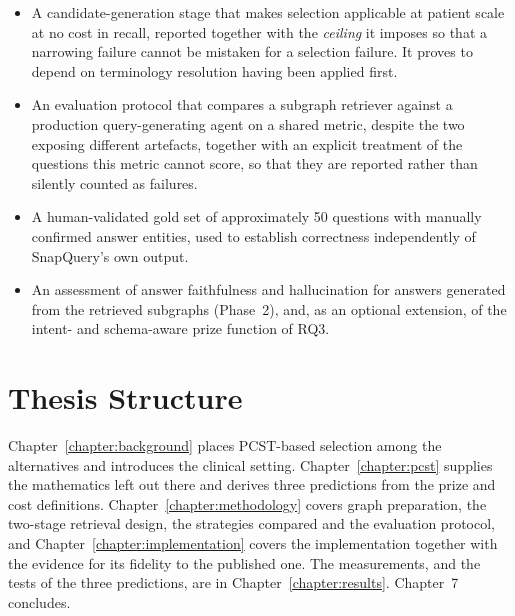 \begin{itemize}
\item A candidate-generation stage that makes selection applicable at patient
scale at no cost in recall, reported together with the \emph{ceiling} it imposes
so that a narrowing failure cannot be mistaken for a selection failure. It proves
to depend on terminology resolution having been applied first.

\item An evaluation protocol that compares a subgraph retriever against a
production query-generating agent on a shared metric, despite the two exposing
different artefacts, together with an explicit treatment of the questions this
metric cannot score, so that they are reported rather than silently counted as
failures.

\item A human-validated gold set of approximately 50 questions with manually
confirmed answer entities, used to establish correctness independently of
SnapQuery's own output.

\item An assessment of answer faithfulness and hallucination for answers
generated from the retrieved subgraphs (Phase~2), and, as an optional extension,
of the intent- and schema-aware prize function of RQ3.
\end{itemize}

\section{Thesis Structure} \label{sec:thesis-structure}

Chapter~\ref{chapter:background} places PCST-based selection among the
alternatives and introduces the clinical setting.
Chapter~\ref{chapter:pcst} supplies the mathematics left out there and derives
three predictions from the prize and cost definitions.
Chapter~\ref{chapter:methodology} covers graph preparation, the two-stage
retrieval design, the strategies compared and the evaluation protocol, and
Chapter~\ref{chapter:implementation} covers the implementation together with the
evidence for its fidelity to the published one. The measurements, and the tests
of the three predictions, are in Chapter~\ref{chapter:results}. Chapter~7
concludes.
